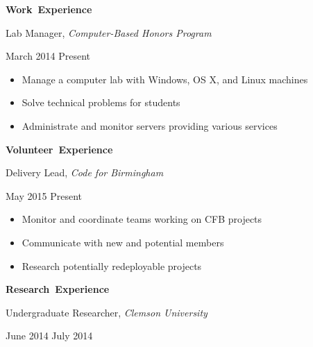 \documentclass[11pt]{article}
\begin{document}
\vspace{0.8em}
\hbox{\large \textbf{Work Experience}}

\begin{minipage}[t]{0.7\textwidth}
\flushleft
Lab Manager, \textit{Computer-Based Honors Program}\\
\end{minipage}
\begin{minipage}[t]{0.3\textwidth}
\flushright
March 2014 \space \textemdash \space Present\\
\end{minipage}

\begin{itemize}
  \item Manage a computer lab with Windows, OS X, and Linux machines
  \item Solve technical problems for students
  \item Administrate and monitor servers providing various services
\end{itemize}

\vspace{0.8em}
\hbox{\large \textbf{Volunteer Experience}}

\vspace{0.4em}
\begin{minipage}[t]{0.7\textwidth}
\flushleft
Delivery Lead, \textit{Code for Birmingham}\\
\end{minipage}
\begin{minipage}[t]{0.3\textwidth}
\flushright
May 2015 \space \textemdash \space Present\\
\end{minipage}

\begin{itemize}
  \item Monitor and coordinate teams working on CFB projects
  \item Communicate with new and potential members
  \item Research potentially redeployable projects
\end{itemize}

\vspace{0.8em}
\hbox{\large \textbf{Research Experience}}

\begin{minipage}[t]{0.7\textwidth}
\flushleft
Undergraduate Researcher, \textit{Clemson University}\\
\end{minipage}
\begin{minipage}[t]{0.3\textwidth}
\flushright
June 2014 \space \textemdash \space July 2014\\
\end{minipage}
\end{document}
